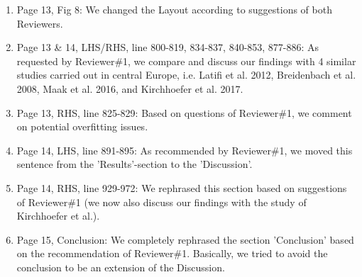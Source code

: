\documentclass{article}
\begin{document}
\begin{enumerate}
	\item Page 13, Fig 8: We changed the Layout according to suggestions of both Reviewers.
	
	\item Page 13 \& 14, LHS/RHS, line 800-819, 834-837, 840-853, 877-886: As requested by Reviewer\#1, we compare and discuss our findings with 4 similar studies carried out in central Europe, i.e. Latifi et al. 2012, Breidenbach et al. 2008, Maak et al. 2016, and Kirchhoefer et al. 2017.
	
	\item Page 13, RHS, line 825-829: Based on questions of Reviewer\#1, we comment on potential overfitting issues.
	
	\item Page 14, LHS, line 891-895: As recommended by Reviewer\#1, we moved this sentence from the 'Results'-section to the 'Discussion'.
	
	\item Page 14, RHS, line 929-972: We rephrased this section based on suggestions of Reviewer\#1 (we now also discuss our findings with the study of Kirchhoefer et al.).
	
	\item Page 15, Conclusion: We completely rephrased the section 'Conclusion' based on the recommendation of Reviewer\#1. Basically, we tried to avoid the conclusion to be an extension of the Discussion.

\end{enumerate}


\end{document}
